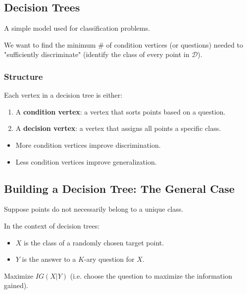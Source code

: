\subsection{Decision Trees}
\begin{motivation}
    A simple model used for classification problems.
    \vspace{1em}

    We want to find the minimum \# of condition vertices (or questions) needed to "sufficiently discriminate" (identify the class of every point in \(\mathcal{D}\)).
\end{motivation}
\subsubsection{Structure}
\begin{definition}
    Each vertex in a decision tree is either:
    \begin{enumerate}
        \item A \textbf{condition vertex}: a vertex that sorts points based on a question.
        \item A \textbf{decision vertex}: a vertex that assigns all points a specific class.
    \end{enumerate}
\end{definition}

\begin{warning}
    \begin{itemize}
        \item More condition vertices improve discrimination.
        \item Less condition vertices improve generalization.
    \end{itemize}
\end{warning}

\subsection{Building a Decision Tree: The General Case}
\begin{motivation}
    Suppose points do not necessarily belong to a unique class.
    \vspace{1em}

    In the context of decision trees:
    \begin{itemize}
        \item \(X\) is the class of a randomly chosen target point.
        \item \(Y\) is the answer to a \(K\)-ary question for \(X\).
    \end{itemize}

    Maximize \(IG(X|Y)\) (i.e. choose the question to maximize the information gained).
\end{motivation}

